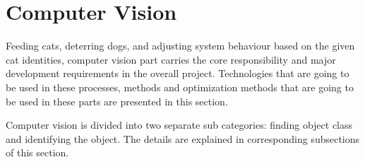 \section{Computer Vision} \label{sec:cv}
Feeding cats, deterring dogs, and adjusting system behaviour based on the given cat identities, computer vision part carries the core responsibility and major development requirements in the overall project. Technologies that are going to be used in these processes, methods and optimization methods that are going to be used in these parts are presented in this section.

Computer vision is divided into two separate sub categories: finding object class and identifying the object. The details are explained in corresponding subsections of this section. 





\clearpage

